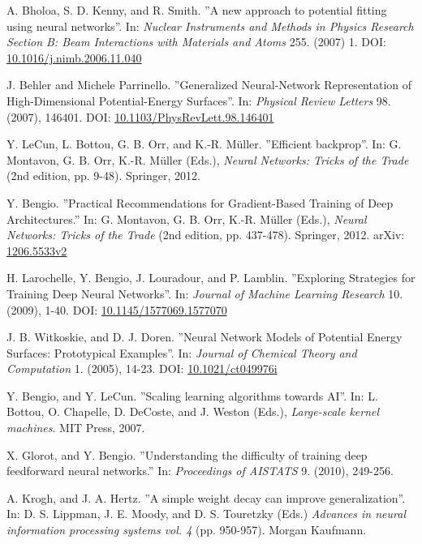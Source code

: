 \documentclass[twoside,english]{uiofysmaster}
\begin{document}
\begin{thebibliography}{56}
 A. Bholoa, S. D. Kenny, and R. Smith.
 ''A new approach to potential fitting using neural networks''.
 In: \textit{Nuclear Instruments and Methods in Physics Research Section B: 
 Beam Interactions with Materials and Atoms} 255. (2007) 1.
 DOI: \href{https://doi.org/10.1016/j.nimb.2006.11.040}{10.1016/j.nimb.2006.11.040}
 
 J. Behler and Michele Parrinello. 
 ''Generalized Neural-Network Representation of High-Dimensional Potential-Energy Surfaces''.
 In: \textit{Physical Review Letters} 98. (2007), 146401. 
 DOI: \href{http://dx.doi.org/10.1103/PhysRevLett.98.146401}{10.1103/PhysRevLett.98.146401}
 
 Y. LeCun, L. Bottou, G. B. Orr, and K.-R. Müller.
 ''Efficient backprop''. 
 In: G. Montavon, G. B. Orr, K.-R. Müller (Eds.), \textit{Neural Networks: Tricks of the Trade} (2nd edition, pp. 9-48).
 Springer, 2012. 
 
 Y. Bengio. 
 ''Practical Recommendations for Gradient-Based Training of Deep Architectures.''
 In: G. Montavon, G. B. Orr, K.-R. Müller (Eds.), \textit{Neural Networks: Tricks of the Trade} (2nd edition, pp. 437-478). 
 Springer, 2012. 
 arXiv: \href{arxiv.org/abs/1206.5533v2}{1206.5533v2}
 
 H. Larochelle, Y. Bengio, J. Louradour, and P. Lamblin. 
 ''Exploring Strategies for Training Deep Neural Networks''. 
 In: \textit{Journal of Machine Learning Research} 10. (2009), 1-40. 
 DOI: \href{http://doi.org/10.1145/1577069.1577070}{10.1145/1577069.1577070}
 
 J. B. Witkoskie, and D. J. Doren. 
 ''Neural Network Models of Potential Energy Surfaces: Prototypical Examples''. 
 In: \textit{Journal of Chemical Theory and Computation} 1. (2005), 14-23. 
 DOI: \href{http://doi.org/10.1021/ct049976i}{10.1021/ct049976i}
 
 Y. Bengio, and Y. LeCun. 
 ''Scaling learning algorithms towards AI''. 
 In: L. Bottou, O. Chapelle, D. DeCoste, and J. Weston (Eds.), 
 \textit{Large-scale kernel machines}. MIT Press, 2007. 
 
 X. Glorot, and Y. Bengio. 
 ''Understanding the difficulty of training deep feedforward neural networks.''
 In: \textit{Proceedings of AISTATS} 9. (2010), 249-256. 
 
 A. Krogh, and J. A. Hertz. 
 ''A simple weight decay can improve generalization''.
 In: D. S. Lippman, J. E. Moody, and D. S. Touretzky (Eds.)
 \textit{Advances in neural information processing systems vol. 4} (pp. 950-957). 
 Morgan Kaufmann. 
 

\end{thebibliography}
\end{document}
